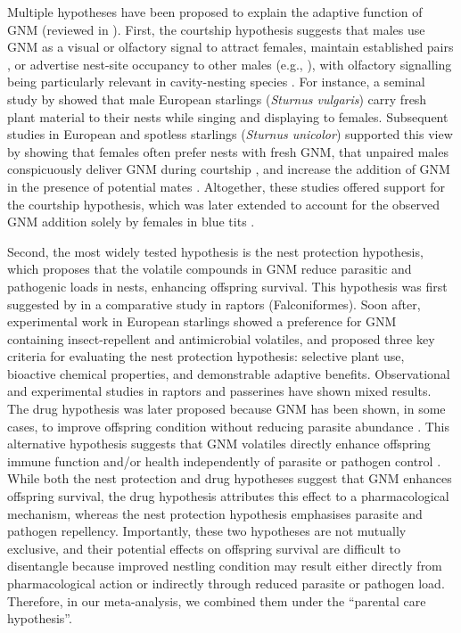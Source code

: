 \documentclass[
  number,
  review,
  onecolumn]{elsarticle}
\begin{document}
Multiple hypotheses have been proposed to explain the adaptive function
of GNM (reviewed in \citep{dubiec2013, scott-baumann2015}). First, the
courtship hypothesis suggests that males use GNM as a visual or
olfactory signal to attract females, maintain established pairs
\citep{veiga2006}, or advertise nest-site occupancy to other males
(e.g., \citep{eens1993, gwinner1997, brouwer2004}), with olfactory
signalling being particularly relevant in cavity-nesting species
\citep{beasley2024}. For instance, a seminal study by \citep{kessel1957}
showed that male European starlings (\emph{Sturnus vulgaris}) carry
fresh plant material to their nests while singing and displaying to
females. Subsequent studies in European and spotless starlings
(\emph{Sturnus unicolor}) supported this view by showing that females
often prefer nests with fresh GNM, that unpaired males conspicuously
deliver GNM during courtship \citep{brouwer2004}, and increase the
addition of GNM in the presence of potential mates \citep{eens1993}.
Altogether, these studies offered support for the courtship hypothesis,
which was later extended to account for the observed GNM addition solely
by females in blue tits \citep{tomás2013}.

Second, the most widely tested hypothesis is the nest protection
hypothesis, which proposes that the volatile compounds in GNM reduce
parasitic and pathogenic loads in nests, enhancing offspring survival.
This hypothesis was first suggested by \citep{wimberger1984} in a
comparative study in raptors (Falconiformes). Soon after, experimental
work in European starlings showed a preference for GNM containing
insect-repellent and antimicrobial volatiles, and \citep{clark1985}
proposed three key criteria for evaluating the nest protection
hypothesis: selective plant use, bioactive chemical properties, and
demonstrable adaptive benefits. Observational and experimental studies
in raptors \citep{ontiveros2008, dykstra2009} and passerines
\citep{lafuma2001, dawson2004, mennerat2009b, quiroga2012} have shown
mixed results. The drug hypothesis was later proposed because GNM has
been shown, in some cases, to improve offspring condition without
reducing parasite abundance \citep{gwinner2000, gwinner2005}. This
alternative hypothesis suggests that GNM volatiles directly enhance
offspring immune function and/or health independently of parasite or
pathogen control \citep{mennerat2009a}. While both the nest protection
and drug hypotheses suggest that GNM enhances offspring survival, the
drug hypothesis attributes this effect to a pharmacological mechanism,
whereas the nest protection hypothesis emphasises parasite and pathogen
repellency. Importantly, these two hypotheses are not mutually
exclusive, and their potential effects on offspring survival are
difficult to disentangle because improved nestling condition may result
either directly from pharmacological action or indirectly through
reduced parasite or pathogen load. Therefore, in our meta-analysis, we
combined them under the ``parental care hypothesis''.
\end{document}

